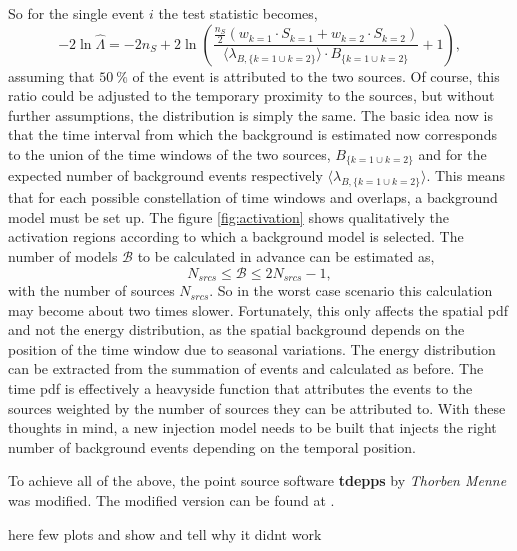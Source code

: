 So for the single event $i$ the test statistic becomes,
\begin{equation}
    -2\ln{\hat{\Lambda}} =-2n_S +2\ln\left(\frac{\frac{n_S}{2}(w_{k=1}\cdot S_{k=1} + w_{k=2} \cdot S_{k=2})}{\langle\lambda_{B,\{k=1\cup k=2\}}\rangle \cdot B_{\{k=1\cup k=2\}}}+1\right) \label{eq:simple_example},
\end{equation}
assuming that $\SI{50}{\percent}$ of the event is attributed to the two sources.
Of course, this ratio could be adjusted to the temporary proximity to the sources, but without further assumptions, the distribution is simply the same.
The basic idea now is that the time interval from which the background is estimated now corresponds to the union of the time windows of the two sources, $B_{\{k=1\cup k=2\}}$ and for the expected number of background events respectively $\langle\lambda_{B,\{k=1\cup k=2\}}\rangle$.
This means that for each possible constellation of time windows and overlaps, a background model must be set up.
The figure \ref{fig:activation} shows qualitatively the activation regions according to which a background model is selected.
The number of models $\mathcal{B}$ to be calculated in advance can be estimated as,
\begin{equation}
  N_{srcs} \leq \mathcal{B}\leq 2N_{srcs}-1, \label{eq:number_of_models}
\end{equation}
with the number of sources $N_{srcs}$.
So in the worst case scenario this calculation may become about two times slower.
Fortunately, this only affects the spatial pdf and not the energy distribution, as the spatial background depends on the position of the time window due to seasonal variations.
The energy distribution can be extracted from the summation of events and calculated as before.
The time pdf is effectively a heavyside function that attributes the events to the sources weighted by the number of sources they can be attributed to.
With these thoughts in mind, a new injection model needs to be built that injects the right number of background events depending on the temporal position.

To achieve all of the above, the point source software \textbf{tdepps} by \textit{Thorben Menne} \cite{tdepps_1} was modified.
The modified version can be found at \cite{tdepps_2}.

here few plots and show and tell why it didnt work
